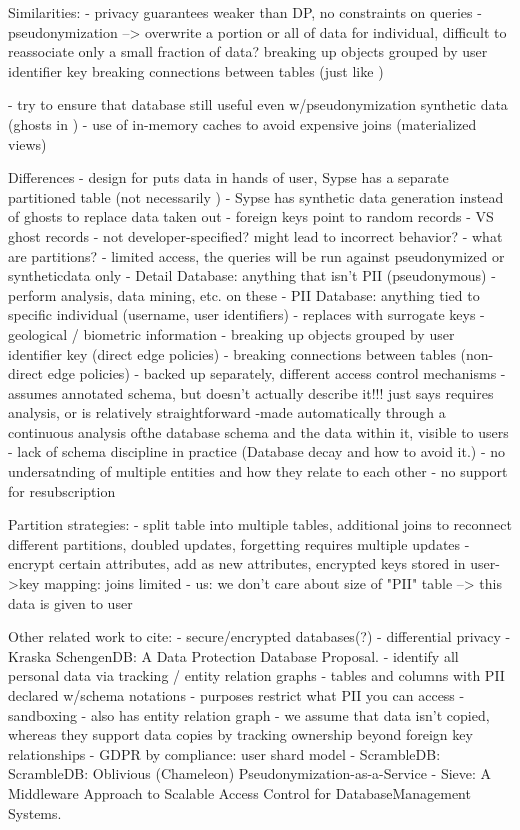 Similarities:
- privacy guarantees weaker than DP, no constraints on queries
- pseudonymization --> overwrite a portion or all of data for individual, difficult to reassociate
    only a small fraction of data?
    breaking up objects grouped by user identifier key
    breaking connections between tables (just like )

- try to ensure that database still useful even w/pseudonymization
    synthetic data (ghosts in \name) 
- use of in-memory caches to avoid expensive joins (materialized views)

Differences
- design for \name puts data in hands of user, Sypse has a separate partitioned table (not
necessarily )
- Sypse has synthetic data generation instead of ghosts to replace data taken out
    - foreign keys point to random records
    - VS ghost records
    - not developer-specified? might lead to incorrect behavior?
- what are partitions?
    - limited access, the queries will be run against pseudonymized or syntheticdata only 
    - Detail Database: anything that isn't PII (pseudonymous)
        - perform analysis, data mining, etc. on these
    - PII Database: anything tied to specific individual (username, user identifiers)
        - replaces with surrogate keys
        - geological / biometric information
        - breaking up objects grouped by user identifier key (direct edge policies)
        - breaking connections between tables (non-direct edge policies)
    - backed up separately, different access control mechanisms
- assumes annotated schema, but doesn't actually describe it!!! just says requires analysis, or is
relatively straightforward
    -made automatically through a continuous analysis ofthe database schema and the data within it,
    visible to users
    - lack of schema discipline in practice (Database decay and how to avoid it.)
    - no undersatnding of multiple entities and how they relate to each other
- no support for resubscription

Partition strategies:
- split table into multiple tables, additional joins to reconnect different partitions, doubled updates, forgetting requires multiple
updates
- encrypt certain attributes, add as new attributes, encrypted keys stored in user->key mapping: joins limited
- us: we don't care about size of "PII" table --> this data is given to user

Other related work to cite: 
- secure/encrypted databases(?)
- differential privacy
- Kraska SchengenDB: A Data Protection Database Proposal.
    - identify all personal data via tracking / entity relation graphs
    - tables and columns with PII declared w/schema notations
    - purposes restrict what PII you can access
    - sandboxing
    - also has entity relation graph
    - we assume that data isn't copied, whereas they support data copies by tracking ownership
    beyond foreign key relationships
- GDPR by compliance: user shard model  
- ScrambleDB: ScrambleDB: Oblivious (Chameleon) Pseudonymization-as-a-Service
- Sieve: A Middleware Approach to Scalable Access Control for DatabaseManagement Systems. 

